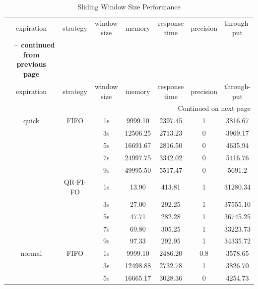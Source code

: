 \begin{center}
	\begin{longtable}{|c||c||c|c|c|c|c|}
	\caption[Sliding Window Size Performance]{Sliding Window Size Performance} \label{tab:6-swsp} \\
	\hline expiration & strategy & \makecell{window \\ size} & memory & \makecell{response \\ time} & precision & \makecell{through-\\put} \\ \hhline{|=#=#=|=|=|=|=|}
	\endfirsthead
	\multicolumn{7}{c} {{\bfseries \tablename\ \thetable{} -- continued from previous page}} \\
	\hline expiration & strategy & \makecell{window \\ size} & memory & \makecell{response \\ time} & precision & \makecell{through-\\put} \\ \hline 
	\endhead
	\hline \multicolumn{7}{|r|}{{Continued on next page}} \\ \hline
	\endfoot
	\hline
	\endlastfoot    
        quick & FIFO & 1s & 9999.10 & 2397.45 & 1 & 3816.67 \\ \cline{3-7}
			  &	     & 3s & 12506.25 & 2713.23 & 0 & 3969.17 \\ \cline{3-7}
			  &      & 5s & 16691.67 & 2816.50 & 0 & 4635.94 \\ \cline{3-7}
			  &      & 7s & 24997.75 & 3342.02 & 0 & 5416.76 \\ \cline{3-7}
			  &      & 9s & 49995.50 & 5517.47 & 0 & 5691.2 \\ \cline{2-7}
			  & QR-FI-FO & 1s & 13.90 & 413.81 & 1 & 31280.34 \\ \cline{3-7}
			  &		     & 3s & 27.00 & 292.25 & 1 & 37555.10 \\ \cline{3-7}
			  &          & 5s & 47.71 & 282.28 & 1 & 36745.25 \\ \cline{3-7}
			  &          & 7s & 69.80 & 305.25 & 1 & 33223.73 \\ \cline{3-7}
			  &          & 9s & 97.33 & 292.95 & 1 & 34335.72 \\ \hhline{|=#=#=|=|=|=|=|}
        normal & FIFO & 1s & 9999.10 & 2486.20 & 0.8 & 3578.65 \\ \cline{3-7}
			   &	  & 3s & 12498.88 & 2732.78 & 1 & 3826.70 \\ \cline{3-7}
			   &      & 5s & 16665.17 & 3028.36 & 0 & 4254.73 \\ \cline{3-7}

\end{longtable}
\end{center}
